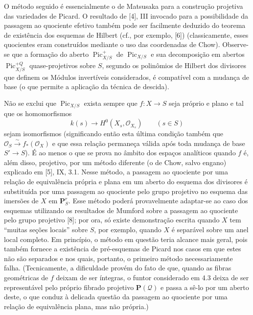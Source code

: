  O método seguido é essencialmente o de Matsusaka para
a construção projetiva das variedades de Picard. O resultado de [4], III
invocado para a possibilidade da passagem ao quociente efetivo também pode ser
facilmente deduzido do teorema de existência dos esquemas de Hilbert (cf., por
exemplo, [6]) (classicamente, esses quocientes eram construídos mediante o uso
das coordenadas de Chow). Observe-se que a formação do aberto
$\operatorname{Pic}^{+}_{X/S}$ de $\operatorname{Pic}_{X/S}$ e sua decomposição
em abertos $\operatorname{Pic}^{+Q}_{X/S}$ quase-projetivos sobre $S$, segundo
os polinômios de Hilbert dos divisores que definem os Módulos invertíveis
considerados, é compatível com a mudança de base (o que permite a aplicação da
técnica de descida).

 Não se exclui que $\operatorname{Pic}_{X/S}$ exista
sempre que $f:X\longrightarrow S$ seja próprio e plano e tal que os
homomorfismos
\[
k(s)\longrightarrow H^0(X_s,\mathcal O_{X_s})\qquad(s\in S)
\]
sejam isomorfismos (significando então esta última condição também que
$\mathcal O_S\xrightarrow{\sim}f_*(\mathcal O_X)$ e que essa relação permaneça
válida após toda mudança de base $S'\longrightarrow S$). É ao menos o que se
prova no âmbito dos espaços analíticos quando $f$ é, além disso, projetivo, por
um método diferente (o de Chow, salvo engano) explicado em [5], IX,
3.1. Nesse método, a passagem ao
quociente por uma relação de equivalência própria e plana em um aberto do
esquema dos divisores é substituída por uma passagem ao quociente pelo grupo
projetivo no esquema das imersões de $X$ em $\mathbf P^r_S$. Esse método poderá
provavelmente adaptar-se ao caso dos esquemas utilizando os resultados de
Mumford sobre a passagem ao quociente pelo grupo projetivo [8]; por ora, só
existe demonstração escrita quando $X$ tem ``muitas seções locais'' sobre $S$,
por exemplo, quando $X$ é separável sobre um anel local completo.
 Em princípio, o método em questão teria alcance mais geral,
pois também fornece a existência de pré-esquemas de Picard nos casos em que
estes não são separados e nos quais, portanto, o primeiro método necessariamente
falha. (Tecnicamente, a dificuldade provém do fato de que, quando as fibras
geométricas de $f$ deixam de ser íntegras, o funtor considerado em 4.3 deixa de
ser representável pelo próprio fibrado projetivo $\mathbf P(\mathcal Q)$ e
passa a sê-lo por um aberto deste, o que conduz à delicada questão da passagem
ao quociente por uma relação de equivalência plana, mas não própria.)

